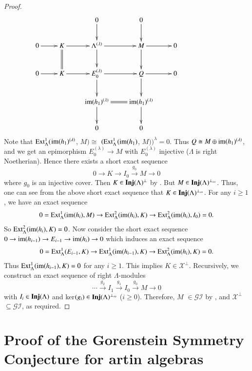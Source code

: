 \documentclass[11pt,a4paper]{article}
\begin{document}
\begin{proof}
 $$\xymatrix{&&0\ar[d]&0\ar[d]&\\0\ar[r]& K\ar[r]
\ar@{=}[d]&\Lambda^{(\lambda)}\ar[d]\ar[r]
&M\ar[d]\ar[r]&0\\
0\ar[r]&  K\ar[r]
& E_{0}^{(\lambda)}\ar[d]\ar[r]
& Q\ar[d]\ar[r]&0\\
 & &{\rm im(}h_{1})^{(\lambda)}\ar[d]\ar@{=}[r]&{\rm im(}h_{1})^{(\lambda)}\ar[d]&&&\\
&&0&0}$$
Note that ${\rm Ext}_{\Lambda}^{1}($${\rm im(}h_{1})^{(\lambda)}$, $M)   \cong  $ $({\rm Ext}_{\Lambda}^{1}$${\rm(im(}h_{1})$, $M))^{\lambda} =  0$.
Thus  $Q \cong M \oplus {\rm im(}h_{1})^{(\lambda)}$, and we get   an epimorphism $E_{0}^{(\lambda)} \rightarrow  M$ with $E_{0}^{(\lambda)}  $ injective ($\Lambda$ is right  Noetherian).
Hence there exists a short exact sequence   $$0 \longrightarrow K \longrightarrow I_{0}  \stackrel {g_{0}}\longrightarrow M \longrightarrow 0$$
where  $g_{0}$ is an  injective cover.  Then $K \in {\bf Inj}(\Lambda)^\perp$ by \cite[Corollary 7.2.3]{eno5}. But   $M \in {\bf Inj}(\Lambda)^{\perp_{\infty}}$.
 Thus, one can see from the above short exact sequence that $K \in  {\bf Inj}(\Lambda)^{\perp_{\infty}}$. For any $i \geq 1$, we have an exact sequence
  $$0 = {\rm Ext}_{\Lambda}^{1}{\rm(im}(h_{i}), M)  \rightarrow  {\rm Ext}_{\Lambda}^{2}{\rm(im}(h_{i}), K)  \rightarrow  {\rm Ext}_{\Lambda}^{2}{\rm(im}(h_{i}), I_{0})  = 0.$$
So  $  {\rm Ext}_{\Lambda}^{2}{\rm(im}(h_{i}), K)   = 0$.  Now consider the short exact sequence
$0\rightarrow  {\rm im(}h_{i - 1})  \rightarrow E_{i - 1}\rightarrow {\rm im(}h_{i})\rightarrow 0   $
which  induces an exact sequence  $$0 = {\rm Ext}_{\Lambda}^{1}(E_{i - 1}, K)  \rightarrow  {\rm Ext}_{\Lambda}^{1}{\rm(im}(h_{i-1}), K)  \rightarrow  {\rm Ext}_{\Lambda}^{2}{\rm(im}(h_{i}), K)  = 0.$$
Thus $  {\rm Ext}_{\Lambda}^{1}{\rm(im}(h_{i-1}), K)   = 0$ for any $i \geq 1$. This implies  $K \in \mathscr{X}^{\perp}$.
Recursively, we construct an exact sequence of right $\Lambda$-modules
$$ \cdots \stackrel {g_{2}} \longrightarrow
I_1\stackrel {g_{1}} \longrightarrow I_0\stackrel {g_{0}}
\longrightarrow M  \longrightarrow  0  $$
with $I_i \in {\bf Inj}(\Lambda)$ and ker$(g_i) \in {\bf Inj}(\Lambda)^{\perp_{\infty}}$ ($i \geq 0$).
Therefore, $M $   $\in \mathscr{GI}$ by \cite[Lemma 17(2)]{gii}, and   $\mathscr{X}^\perp $   $\subseteq \mathscr{GI}$, as required. \end{proof}



\medskip


\section{Proof of the Gorenstein Symmetry Conjecture for artin algebras }
\end{document}

